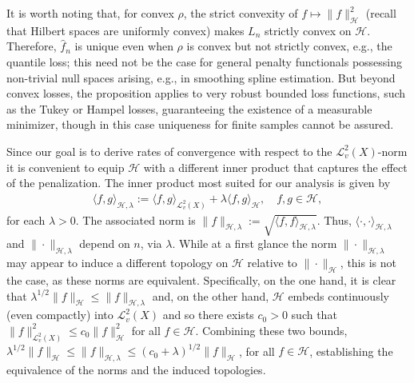 \documentclass[11pt]{article}
\theoremstyle{definition}
\theoremstyle{remark}
\begin{document}
It is worth noting that, for convex $\rho$, the strict convexity of $f \mapsto \|f\|_{\mathcal{H}}^2$ (recall that Hilbert spaces are uniformly convex) makes $L_n$ strictly convex on $\mathcal{H}$. Therefore, $\widehat{f}_n$ is unique even when $\rho$ is convex but not strictly convex, e.g., the quantile loss; this need not be the case for general penalty functionals possessing non-trivial null spaces arising, e.g., in smoothing spline estimation. But beyond convex losses, the proposition applies to very robust bounded loss functions, such as the Tukey or Hampel losses, guaranteeing the existence of a measurable minimizer, though in this case uniqueness for finite samples cannot be assured.

Since our goal is to derive rates of convergence with respect to the $\mathcal{L}^2_v(X)$-norm it is convenient to equip $\mathcal{H}$ with a different inner product that captures the effect of the penalization. The inner product most suited for our analysis is given by
\begin{align}
\label{eq:ip}
\langle f,g \rangle_{\mathcal{H},\lambda} := \langle f,g \rangle_{\mathcal{L}^2_v(X)} + \lambda \langle f, g \rangle_{\mathcal{H}}, \quad f,g \in \mathcal{H},
\end{align}
for each $\lambda>0$. The associated norm is $\|f\|_{\mathcal{H},\lambda} := \sqrt{\langle f, f \rangle_{\mathcal{H},\lambda}}$. Thus, $\langle \cdot, \cdot \rangle_{\mathcal{H},\lambda}$ and $\|\cdot\|_{\mathcal{H},\lambda}$ depend on $n$, via $\lambda$. While at a first glance the norm $\|\cdot\|_{\mathcal{H},\lambda}$ may appear to induce a different topology on $\mathcal{H}$ relative to $\|\cdot\|_{\mathcal{H}}$, this is not the case, as these norms are equivalent. Specifically, on the one hand, it is clear that $\lambda^{1/2}\|f\|_{\mathcal{H}} \leq  \|f\|_{\mathcal{H},\lambda}$ and, on the other hand, $\mathcal{H}$ embeds continuously (even compactly) into $\mathcal{L}_v^2(X)$ \citep[see, e.g.,][Lemma 2.6]{St:2012} and so there exists $c_0>0$ such that $\|f\|_{\mathcal{L}^2_v(X)}^2 \leq c_0 \|f\|_{\mathcal{H}}^2$ for all $f \in \mathcal{H}$.  Combining these two bounds, $\lambda^{1/2} \|f\|_{\mathcal{H}} \leq \|f\|_{\mathcal{H},\lambda} \leq (c_0+\lambda)^{1/2} \|f\|_{\mathcal{H}}$, for all $f \in \mathcal{H}$, establishing the equivalence of the norms and the induced topologies.
\end{document}
